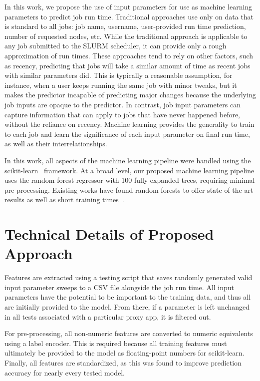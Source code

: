 \documentclass[conference, 10pt, onecolumn, draftclsnofoot]{IEEEtran}
\begin{document}
In this work, we propose the use of input parameters for use as machine learning parameters to predict job run time.
Traditional approaches use only on data that is standard to all jobs: job name, username, user-provided run time prediction, number of requested nodes, etc.
While the traditional approach is applicable to any job submitted to the SLURM scheduler, it can provide only a rough approximation of run times.
These approaches tend to rely on other factors, such as recency, predicting that jobs will take a similar amount of time as recent jobs with similar parameters did.
This is typically a reasonable assumption, for instance, when a user keeps running the same job with minor tweaks, but it makes the predictor incapable of predicting major changes because the underlying job inputs are opaque to the predictor.
In contrast, job input parameters can capture information that can apply to jobs that have never happened before, without the reliance on recency.
Machine learning provides the generality to train to each job and learn the significance of each input parameter on final run time, as well as their interrelationships.

In this work, all aspects of the machine learning pipeline were handled using the scikit-learn~\cite{scikit} framework.
At a broad level, our proposed machine learning pipeline uses the random forest regressor with 100 fully expanded trees, requiring minimal pre-processing.
Existing works have found random forests to offer state-of-the-art results as well as short training times~\cite{survey,7776517,PRIONN,10.1007/978-3-030-48340-1_48}.

\section{Technical Details of Proposed Approach}

Features are extracted using a testing script that saves randomly generated valid input parameter sweeps to a CSV file alongside the job run time.
All input parameters have the potential to be important to the training data, and thus all are initially provided to the model.
From there, if a parameter is left unchanged in all tests associated with a particular proxy app, it is filtered out.

For pre-processing, all non-numeric features are converted to numeric equivalents using a label encoder.
This is required because all training features must ultimately be provided to the model as floating-point numbers for scikit-learn.
Finally, all features are standardized, as this was found to improve prediction accuracy for nearly every tested model.
\end{document}
